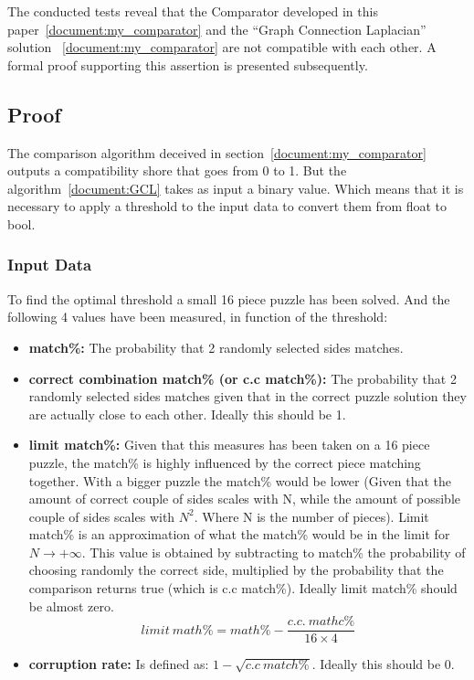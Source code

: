 \documentclass{article}
\begin{document}
The conducted tests reveal that the Comparator developed in this paper~\cref{document:my_comparator}
and the ``Graph Connection Laplacian'' solution ~\cref{document:my_comparator} are not compatible with each other.
A formal proof supporting this assertion is presented subsequently.

\subsection{Proof}

The comparison algorithm deceived in section~\cref{document:my_comparator} outputs a compatibility
shore that goes from 0 to 1.\newline
But the algorithm~\cref{document:GCL} takes as input a binary value.
Which means that it is necessary to apply a threshold to the input
data to convert them from float to bool.
\subsubsection{Input Data}
To find the optimal threshold a small 16 piece puzzle has been solved.
And the following 4 values have been measured, in function of the threshold:

\begin{itemize}
  \item \textbf{match\%:}\newline
  The probability that 2 randomly selected sides matches.
  
  \item \textbf{correct combination match\% (or c.c match\%):}\newline
  The probability that 2 randomly selected sides matches given that in the correct puzzle
  solution they are actually close to each other. Ideally this should be 1.
  
  \item \textbf{limit match\%:}\newline
  Given that this measures has been taken on a 16 piece puzzle,
  the match\% is highly influenced by the correct piece matching together.
  With a bigger puzzle the match\% would be lower (Given that the amount
  of correct couple of sides scales with N, while the amount of
  possible couple of sides scales with \(N^2\). Where N is the number of pieces).\newline
  Limit match\% is an approximation of what the match\%
  would be in the limit for \(N \rightarrow + \infty\).
  This value is obtained by subtracting to match\%
  the probability of choosing randomly the correct side,
  multiplied by the probability that the comparison returns true
  (which is c.c match\%). \newline
  Ideally limit match\% should be almost zero.
  \[limit \: math\% = math\% - \frac{c.c. \: mathc\%}{16 \times 4}\]
  
  \item \textbf{corruption rate:}\newline
  Is defined as: \(1-\sqrt{c.c \: match\%}\). Ideally this should be 0.

\end{itemize}
\end{document}
